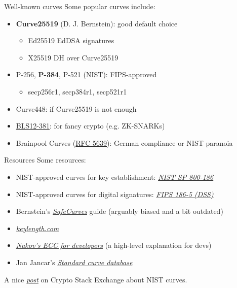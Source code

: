\begin{frame}{Well-known curves}
  \label{slide:curve-ex}
  Some popular curves include:
  \begin{itemize}[<+(1)->]
    \item \textbf{Curve25519} (D. J. Bernstein): good default choice
    \begin{itemize}
      \item Ed25519 EdDSA signatures
      \item X25519 DH over Curve25519
    \end{itemize}
    \item P-256, \textbf{P-384}, P-521 (NIST): FIPS-approved
    \begin{itemize}
      \item secp256r1, secp384r1, secp521r1 
    \end{itemize}
    \item Curve448: if Curve25519 is not enough
    \item \href{https://hackmd.io/@benjaminion/bls12-381}{BLS12-381}: for fancy crypto (e.g. ZK-SNARKs)
    \item Brainpool Curves (\href{https://datatracker.ietf.org/doc/html/rfc5639}{RFC 5639}): German compliance or NIST paranoia
  \end{itemize}
\end{frame}

\begin{frame}{Resources}
  Some resources:
  \begin{itemize}[<+(1)->]
    \item NIST-approved curves for key establishment: \href{https://csrc.nist.gov/pubs/sp/800/186/final}{\textit{NIST SP 800-186}}
    \item NIST-approved curves for digital signatures: \href{https://csrc.nist.gov/pubs/fips/186-5/final}{\textit{FIPS 186-5 (DSS)}}
    \item Bernstein's \href{https://safecurves.cr.yp.to}{\emph{SafeCurves}} guide (arguably biased and a bit outdated)
    \item \href{https://www.keylength.com/en/}{\textit{keylength.com}}
    \item \href{https://cryptobook.nakov.com/asymmetric-key-ciphers/elliptic-curve-cryptography-ecc}{\textit{Nakov's ECC for developers}} (a high-level explanation for devs)
    \item Jan Jancar's \href{https://neuromancer.sk/std/}{\textit{Standard curve database}}
  \end{itemize}

  \pause
  A nice \href{https://crypto.stackexchange.com/questions/93519/why-are-nist-curves-still-used}{\textit{post}} on Crypto Stack Exchange about NIST curves.
\end{frame}

